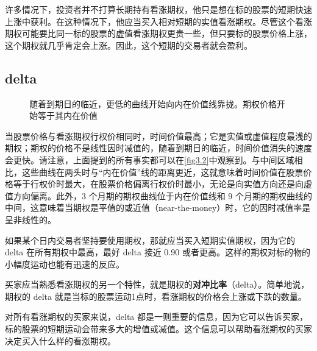 许多情况下，投资者并不打算长期持有看涨期权，他只是想在标的股票的短期快速上涨中获利。在这种情况下，他应当买入相对短期的实值看涨期权。尽管这个看涨期权可能要比同一标的股票的虚值看涨期权更贵一些，但只要标的股票价格上涨，这个期权就几乎肯定会上涨。因此，这个短期的交易者就会盈利。

\subsection{delta}
\begin{figure}
    \centering
    \caption{随着到期日的临近，更低的曲线开始向内在价值线靠拢。期权价格开始等于其内在价值}
    \label{fig3.2}
\end{figure}

当股票价格与看涨期权行权价相同时，时间价值最高；它是实值或虚值程度最浅的期权；期权的价格不是线性因时减值的，随着到期日的临近，时间价值消失的速度会更快。请注意，上面提到的所有事实都可以在\autoref{fig3.2}中观察到。与中间区域相比，这些曲线在两头时与“内在价值”线的距离更近，这就意味着时间价值在股票价格等于行权价时最大，在股票价格偏离行权价时最小，无论是向实值方向还是向虚值方向偏离。此外，3 个月期的期权曲线位于内在价值线和 9 个月期的期权曲线的中间，这意味着当期权是平值的或近值（near-the-money）时，它的因时减值率是呈非线性的。

如果某个日内交易者坚持要使用期权，那就应当买入短期实值期权，因为它的 delta 在所有期权中最高，最好 delta 接近 0.90 或者更高。这样的期权对标的物的小幅度运动也能有迅速的反应。

买家应当熟悉看涨期权的另一个特性，就是期权的\textbf{对冲比率}（delta）。简单地说，期权的 delta 就是当标的股票运动1点时，看涨期权的价格会上涨或下跌的数量。

对所有看涨期权的买家来说，delta 都是一则重要的信息，因为它可以告诉买家，标的股票的短期运动会带来多大的增值或减值。这个信息可以帮助看涨期权的买家决定买入什么样的看涨期权。

